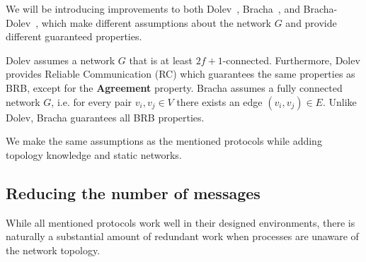 
We will be introducing improvements to both Dolev~\cite{dolev}, Bracha~\cite{bracha}, and Bracha-Dolev~\cite{bracha-dolev}, which make different assumptions about the network $G$ and provide different guaranteed properties. 


Dolev assumes a network $G$ that is at least $2f+1$-connected.
Furthermore, Dolev provides Reliable Communication (RC) which guarantees the same properties as BRB, except for the \textbf{Agreement} property. Bracha assumes a fully connected network $G$, i.e. for every pair $v_i,v_j \in V$ there exists an edge $(v_i, v_j) \in E$. Unlike Dolev, Bracha guarantees all BRB properties.

We make the same assumptions as the mentioned protocols while adding topology knowledge and static networks.

\subsection*{Reducing the number of messages}

While all mentioned protocols work well in their designed environments, there is naturally a substantial amount of redundant work when processes are unaware of the network topology.


